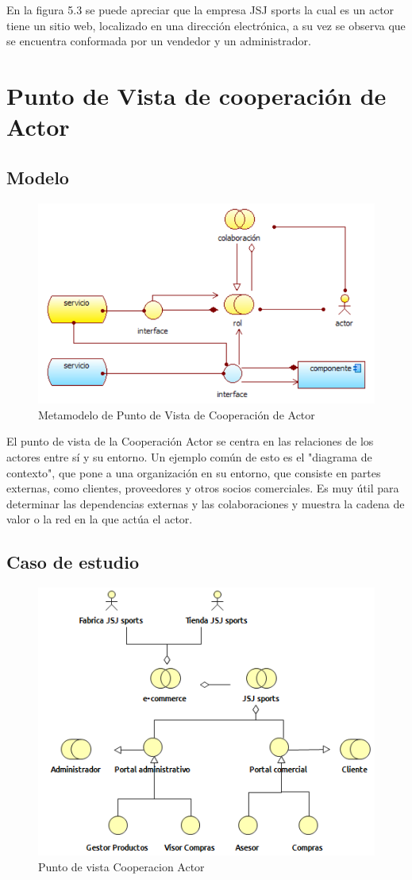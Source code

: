 En la figura 5.3 se puede apreciar que la empresa JSJ sports la cual es un actor tiene un sitio web, localizado en una dirección electrónica, a su vez se observa que se encuentra conformada por un vendedor y un administrador.

\newpage


\section{Punto de Vista de cooperación de Actor}

\subsection{Modelo}
\begin{figure}[th!]
	\centering
	\includegraphics[width=0.5\linewidth]{arquitectura/imagenes/modelocooperacionActor}
	\caption{Metamodelo de Punto de Vista de Cooperación de Actor \cite{pun2}}
	\label{fig:metamodelo de punto de vista de cooperacion de actor}
\end{figure}

El punto de vista de la Cooperación Actor se centra en las relaciones de los actores entre sí y su entorno. Un ejemplo común de esto es el "diagrama de contexto", que pone a una organización en su entorno, que consiste en partes externas, como clientes, proveedores y otros socios comerciales. Es muy útil para determinar las dependencias externas y las colaboraciones y muestra la cadena de valor o la red en la que actúa el actor.


\subsection{Caso de estudio}

\begin{figure}[th!]
	\centering
	\includegraphics[width=0.6\linewidth]{arquitectura/imagenes/VistaCooperacionActor}
	\caption{Punto de vista Cooperacion Actor}
	\label{fig:Punto de vista Cooperacion Actor}
\end{figure}

